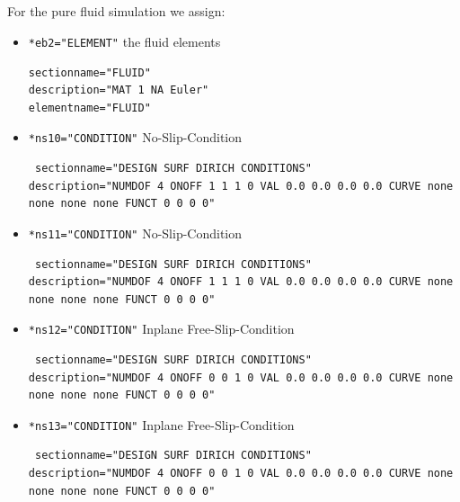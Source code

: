 \subsection{\bc}
For the pure fluid simulation we assign:

\begin{itemize}
 \item \verb|*eb2="ELEMENT"| \qquad the fluid elements
 \begin{small} \begin{verbatim}
sectionname="FLUID"
description="MAT 1 NA Euler"
elementname="FLUID"
\end{verbatim} \end{small}


 \item \verb|*ns10="CONDITION"| \qquad No-Slip-Condition
\begin{small} \begin{verbatim} sectionname="DESIGN SURF DIRICH CONDITIONS"
description="NUMDOF 4 ONOFF 1 1 1 0 VAL 0.0 0.0 0.0 0.0 CURVE none none none none FUNCT 0 0 0 0"
\end{verbatim} \end{small}

 \item \verb|*ns11="CONDITION"| \qquad No-Slip-Condition
\begin{small} \begin{verbatim} sectionname="DESIGN SURF DIRICH CONDITIONS"
description="NUMDOF 4 ONOFF 1 1 1 0 VAL 0.0 0.0 0.0 0.0 CURVE none none none none FUNCT 0 0 0 0"
\end{verbatim} \end{small}

 \item \verb|*ns12="CONDITION"| \qquad Inplane Free-Slip-Condition
\begin{small} \begin{verbatim} sectionname="DESIGN SURF DIRICH CONDITIONS"
description="NUMDOF 4 ONOFF 0 0 1 0 VAL 0.0 0.0 0.0 0.0 CURVE none none none none FUNCT 0 0 0 0"
\end{verbatim} \end{small}

 \item \verb|*ns13="CONDITION"| \qquad Inplane Free-Slip-Condition
\begin{small} \begin{verbatim} sectionname="DESIGN SURF DIRICH CONDITIONS"
description="NUMDOF 4 ONOFF 0 0 1 0 VAL 0.0 0.0 0.0 0.0 CURVE none none none none FUNCT 0 0 0 0"
\end{verbatim} \end{small}


\end{itemize}
